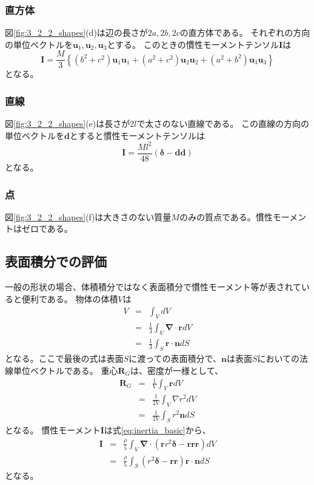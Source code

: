 \documentclass[a4paper,11pt]{jbook}
\begin{document}
\subsubsection{直方体}
図\ref{fig:3_2_2_shapes}(d)は辺の長さが$2a,2b,2c$の直方体である。
それぞれの方向の単位ベクトルを$\bm{u}_1,\bm{u}_2,\bm{u}_3$とする。
このときの慣性モーメントテンソル$\bm{I}$は
\begin{equation}
\bm{I}=\frac{M}{3}\left\{\left(b^2+c^2\right)\bm{u}_1\bm{u}_1 
+\left(a^2+c^2\right)\bm{u}_2\bm{u}_2
+\left(a^2+b^2\right)\bm{u}_3\bm{u}_3
 \right\}
\end{equation}
となる。
\subsubsection{直線}
図\ref{fig:3_2_2_shapes}(e)は長さが$2l$で太さのない直線である。
この直線の方向の単位ベクトルを$\bm{d}$とすると慣性モーメントテンソルは
\begin{equation}
\bm{I}=\frac{Ml^2}{48}\left(\bm{\delta}-\bm{d}\bm{d}\right)
\end{equation}
となる。
\subsubsection{点}
図\ref{fig:3_2_2_shapes}(f)は大きさのない質量$M$のみの質点である。慣性モーメントはゼロである。
\subsection{表面積分での評価}
一般の形状の場合、体積積分ではなく表面積分で慣性モーメント等が表されていると便利である。
物体の体積$V$は
\begin{eqnarray}
V&=&\int_VdV \nonumber\\
  &=&\frac13\int_V\bm{\nabla}\cdot\bm{r}dV \nonumber\\
  &=& \frac13\int_S\bm{r}\cdot\bm{n}dS
\end{eqnarray}
となる。ここで最後の式は表面$S$に渡っての表面積分で、$\bm{n}$は表面$S$においての法線単位ベクトルである。
重心$\bm{R}_G$は、密度が一様として、
\begin{eqnarray}
\bm{R}_G&=&\frac{1}{V}\int_V\bm{r}dV \nonumber\\
&=&\frac{1}{2V}\int_V\nabla r^2 dV \nonumber\\
&=&\frac{1}{2V}\int_Sr^2\bm{n}dS
\end{eqnarray}
となる。
慣性モーメント$\bm{I}$は式\eqref{eq:inertia_basic}から、
\begin{eqnarray}
\bm{I}&=&\frac{\rho}{5}\int_V\bm{\nabla}\cdot(\bm{r}r^2\bm{\delta}-\bm{r}\bm{r}\bm{r})dV \nonumber \\
&=& \frac{\rho}{5}\int_S\left(r^2\bm{\delta}-\bm{r}\bm{r} \right)\bm{r}\cdot\bm{n}dS
\end{eqnarray}
となる。
\end{document}
